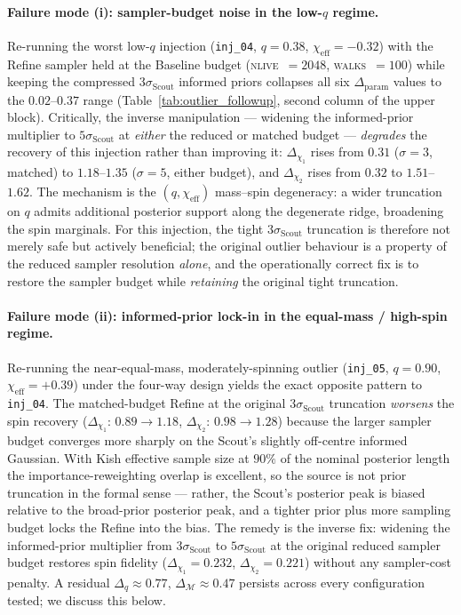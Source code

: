 \documentclass[12pt]{article}
\begin{document}
\paragraph{Failure mode (i): sampler-budget noise in the low-$q$ regime.}
Re-running the worst low-$q$ injection (\texttt{inj\_04}, $q=0.38$, $\chi_{\mathrm{eff}} = -0.32$) with the Refine sampler held at the Baseline budget (\textsc{nlive}~$=2048$, \textsc{walks}~$=100$) while keeping the compressed $3\sigma_{\mathrm{Scout}}$ informed priors collapses all six $\Delta_{\mathrm{param}}$ values to the $0.02$--$0.37$ range (Table~\ref{tab:outlier_followup}, second column of the upper block). Critically, the inverse manipulation --- widening the informed-prior multiplier to $5\sigma_{\mathrm{Scout}}$ at \emph{either} the reduced or matched budget --- \emph{degrades} the recovery of this injection rather than improving it: $\Delta_{\chi_1}$ rises from $0.31$ ($\sigma=3$, matched) to $1.18$--$1.35$ ($\sigma=5$, either budget), and $\Delta_{\chi_2}$ rises from $0.32$ to $1.51$--$1.62$. The mechanism is the $(q,\chi_{\mathrm{eff}})$ mass--spin degeneracy: a wider truncation on $q$ admits additional posterior support along the degenerate ridge, broadening the spin marginals. For this injection, the tight $3\sigma_{\mathrm{Scout}}$ truncation is therefore not merely safe but actively beneficial; the original outlier behaviour is a property of the reduced sampler resolution \emph{alone}, and the operationally correct fix is to restore the sampler budget while \emph{retaining} the original tight truncation.

\paragraph{Failure mode (ii): informed-prior lock-in in the equal-mass / high-spin regime.}
Re-running the near-equal-mass, moderately-spinning outlier (\texttt{inj\_05}, $q=0.90$, $\chi_{\mathrm{eff}} = +0.39$) under the four-way design yields the exact opposite pattern to \texttt{inj\_04}. The matched-budget Refine at the original $3\sigma_{\mathrm{Scout}}$ truncation \emph{worsens} the spin recovery ($\Delta_{\chi_1}$: $0.89 \to 1.18$, $\Delta_{\chi_2}$: $0.98 \to 1.28$) because the larger sampler budget converges more sharply on the Scout's slightly off-centre informed Gaussian. With Kish effective sample size at $90\%$ of the nominal posterior length the importance-reweighting overlap is excellent, so the source is not prior truncation in the formal sense --- rather, the Scout's posterior peak is biased relative to the broad-prior posterior peak, and a tighter prior plus more sampling budget locks the Refine into the bias. The remedy is the inverse fix: widening the informed-prior multiplier from $3\sigma_{\mathrm{Scout}}$ to $5\sigma_{\mathrm{Scout}}$ at the original reduced sampler budget restores spin fidelity ($\Delta_{\chi_1} = 0.232$, $\Delta_{\chi_2} = 0.221$) without any sampler-cost penalty. A residual $\Delta_q \approx 0.77$, $\Delta_{\mathcal{M}} \approx 0.47$ persists across every configuration tested; we discuss this below.
\end{document}

